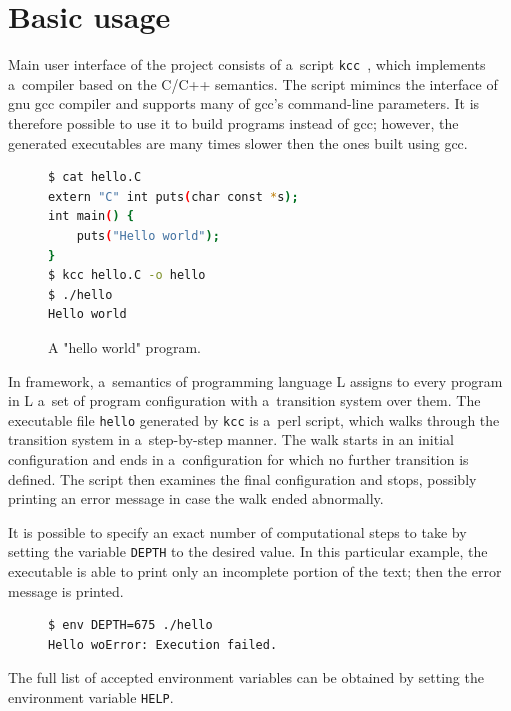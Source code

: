 \documentclass{fithesis3}
\newcommand{\kcc}{\texttt{kcc}\xspace}
\begin{document}
\section{Basic usage}

Main user interface of the project consists of a~script \kcc~\cite{hathhorn-ellison-rosu-2015-pldi}, which implements a~compiler based on the C/C++ semantics. The script mimincs the interface of gnu gcc compiler and supports many of gcc's command-line parameters. It is therefore possible to use it to build programs instead of gcc; however, the generated executables are many times slower then the ones built using gcc.

\begin{figure}[ht]
\begin{lstlisting}[language=bash]
$ cat hello.C
extern "C" int puts(char const *s);
int main() {
	puts("Hello world");
}
$ kcc hello.C -o hello
$ ./hello
Hello world
\end{lstlisting}
\caption{A "hello world" program.}
\label{helloWorldSource}
\end{figure}

In \K framework, a~semantics of programming language L assigns to every program in L a~set of program configuration with a~transition system over them. The executable file \texttt{hello} generated by \kcc is a~perl script, which walks through the transition system in a~step-by-step manner. The walk starts in an initial configuration and ends in a~configuration for which no further transition is defined. The script then examines the final configuration and stops, possibly printing an error message in case the walk ended abnormally.

It is possible to specify an exact number of computational steps to take by setting the variable \texttt{DEPTH} to the desired value. In this particular example, the executable is able to print only an incomplete portion of the text; then the error message is printed. 

\begin{figure}[ht]
\begin{lstlisting}[language=bash]
$ env DEPTH=675 ./hello
Hello woError: Execution failed.
\end{lstlisting}
\end{figure}

The full list of accepted environment variables can be obtained by setting the environment variable \texttt{HELP}.

\end{document}
